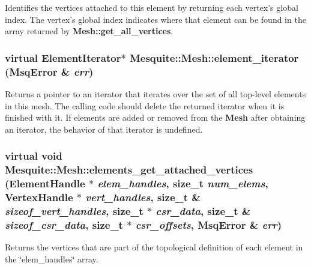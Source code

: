 \documentclass[letter]{report}
\begin{document}
Identifies the vertices attached to this element by returning each vertex's global index. The vertex's global index indicates where that element can be found in the array returned by {\bf Mesh::get\_\-all\_\-vertices}. 

\subsubsection{\setlength{\rightskip}{0pt plus 5cm}virtual Element\-Iterator$\ast$ Mesquite::Mesh::element\_\-iterator ({\bf Msq\-Error} \& {\em err})\hspace{0.3cm}{\tt  [pure virtual]}}\label{classMesquite_1_1Mesh_a6}


Returns a pointer to an iterator that iterates over the set of all top-level elements in this mesh. The calling code should delete the returned iterator when it is finished with it. If elements are added or removed from the {\bf Mesh} after obtaining an iterator, the behavior of that iterator is undefined. 

\subsubsection{\setlength{\rightskip}{0pt plus 5cm}virtual void Mesquite::Mesh::elements\_\-get\_\-attached\_\-vertices (Element\-Handle $\ast$ {\em elem\_\-handles}, size\_\-t {\em num\_\-elems}, Vertex\-Handle $\ast$ {\em vert\_\-handles}, size\_\-t \& {\em sizeof\_\-vert\_\-handles}, size\_\-t $\ast$ {\em csr\_\-data}, size\_\-t \& {\em sizeof\_\-csr\_\-data}, size\_\-t $\ast$ {\em csr\_\-offsets}, {\bf Msq\-Error} \& {\em err})\hspace{0.3cm}{\tt  [pure virtual]}}\label{classMesquite_1_1Mesh_a18}


Returns the vertices that are part of the topological definition of each element in the \char`\"{}elem\_\-handles\char`\"{} array.
\end{document}
